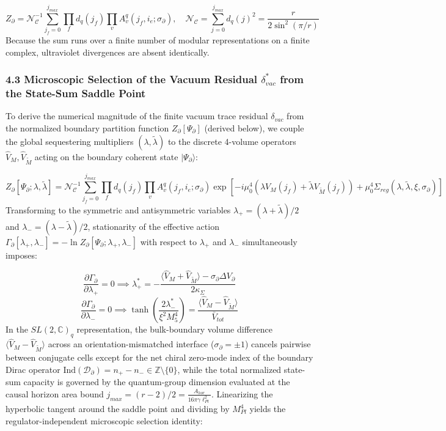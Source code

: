 \documentclass[aps,prd,onecolumn,superscriptaddress,nofootinbib,longbibliography,10pt]{revtex4-2}
\begin{document}
{{  \[ Z_\partial = \mathcal{N}_{\mathcal{C}}^{-1} \sum_{j_f=0}^{j_{max}} \prod_f d_q(j_f) \prod_v A_v^q(j_f, i_e; \sigma_\partial), \quad \mathcal{N}_{\mathcal{C}} = \sum_{j=0}^{j_{max}} d_q(j)^2 = \frac{r}{2\sin^2(\pi/r)} \]
  Because the sum runs over a finite number of modular representations on a finite complex, ultraviolet divergences are absent identically.



  
\subsubsection*{4.3 Microscopic Selection of the Vacuum Residual \(\delta_{vac}^*\) from the State-Sum Saddle Point}

  To derive the numerical magnitude of the finite vacuum trace residual \(\delta_{vac}\) from the normalized boundary partition function \(Z_\partial[\Psi_\partial]\) (derived below), we couple the global sequestering multipliers \((\lambda, \tilde{\lambda})\) to the discrete 4-volume operators \(\hat{V}_M, \hat{V}_{\tilde{M}}\) acting on the boundary coherent state \(|\Psi_\partial\rangle\):


  \[ Z_\partial[\Psi_\partial; \lambda, \tilde{\lambda}] = \mathcal{N}_{\mathcal{C}}^{-1} \sum_{j_f=0}^{j_{max}} \prod_f d_q(j_f) \prod_v A_v^q(j_f, i_e; \sigma_\partial) \exp\left[ -i\mu_0^4\left(\lambda V_M(j_f) + \tilde{\lambda} V_{\tilde{M}}(j_f)\right) + \mu_0^4\Sigma_{reg}(\lambda, \tilde{\lambda}, \xi, \sigma_\partial) \right] \]
  Transforming to the symmetric and antisymmetric variables \(\lambda_+ = (\lambda + \tilde{\lambda})/2\) and \(\lambda_- = (\lambda - \tilde{\lambda})/2\), stationarity of the effective action \(\Gamma_\partial[\lambda_+, \lambda_-] = -\ln Z_\partial[\Psi_\partial; \lambda_+, \lambda_-]\) with respect to \(\lambda_+\) and \(\lambda_-\) simultaneously imposes:


  \[ \frac{\partial\Gamma_\partial}{\partial\lambda_+} = 0 \implies \lambda_+^* = -\frac{\langle \hat{V}_M + \hat{V}_{\tilde{M}} \rangle - \sigma_\partial\Delta V_\partial}{2\kappa_\Sigma} \]
  \[ \frac{\partial\Gamma_\partial}{\partial\lambda_-} = 0 \implies \tanh\left(\frac{2\lambda_-^*}{\xi^2 M_5^4}\right) = \frac{\langle \hat{V}_M - \hat{V}_{\tilde{M}} \rangle}{\bar{V}_{tot}} \]
  In the \(SL(2,\mathbb{C})_q\) representation, the bulk-boundary volume difference \(\langle \hat{V}_M - \hat{V}_{\tilde{M}} \rangle\) across an orientation-mismatched interface (\(\sigma_\partial = \pm 1\)) cancels pairwise between conjugate cells except for the net chiral zero-mode index of the boundary Dirac operator \(\text{Ind}(\mathcal{D}_\partial) = n_+ - n_- \in \mathbb{Z}\setminus\{0\}\), while the total normalized state-sum capacity is governed by the quantum-group dimension evaluated at the causal horizon area bound \(j_{max} = (r-2)/2 = \frac{A_{hor}}{16\pi\gamma\ell_{Pl}^2}\). Linearizing the hyperbolic tangent around the saddle point and dividing by \(M_{Pl}^4\) yields the regulator-independent microscopic selection identity:


}}
\end{document}
